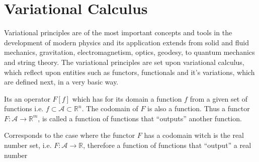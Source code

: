 \section{Variational Calculus}
Variational principles are of the most important concepts and tools in the development of modern physics and its application extends from solid and fluid mechanics, gravitation, electromagnetism, optics, geodesy, to quantum mechanics and string theory.
The variational principles are set upon variational calculus, which reflect upon entities such as functors, functionals and it's  variations, which are defined next, in a very basic way.
\vspace{5mm}
\begin{defi} 
Its an operator $F[f]$ which has for its domain a function $f$ from a given set of functions i.e. $f \subset \mathcal{A} \subset \mathbb{R}^n$. The codomain of $F$ is also a function. Thus a functor $F:\mathcal{A} \rightarrow \mathbb{R}^m$, is called a function of functions that ``outputs'' another function.  
\end{defi}
\begin{defi} 
Corresponds to the case where the functor $F$ has a codomain witch is the real number set, i.e. $F:\mathcal{A} \rightarrow \mathbb{R}$, therefore a function of functions that ``output'' a real number 
\end{defi}


